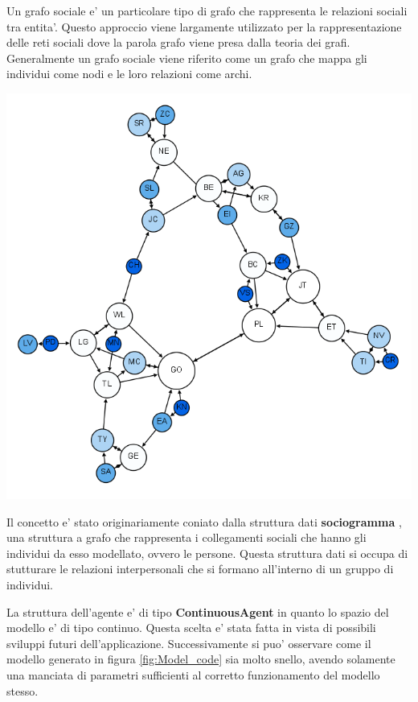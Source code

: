 Un grafo sociale e' un particolare tipo di grafo che rappresenta le relazioni sociali tra entita'.
Questo approccio viene largamente utilizzato per la rappresentazione delle reti sociali dove la 
parola grafo viene presa dalla teoria dei grafi. Generalmente un grafo sociale viene riferito come un
grafo che mappa gli individui come nodi e le loro relazioni come archi. \cite{wiki:Social_graph}

\begin{minipage}{\linewidth}
    \centering
    \includegraphics[width=\textwidth]{img/Moreno_Sociogram_3rd_Grade.png}
    \label{fig:social_graph}
\end{minipage}

Il concetto e' stato originariamente coniato dalla struttura dati \textbf{sociogramma} \cite{wiki:Sociogram}, 
una struttura a grafo che rappresenta i collegamenti sociali che hanno gli individui da esso modellato, ovvero le persone. 
Questa struttura dati si occupa di stutturare le relazioni interpersonali che si formano all'interno di un 
gruppo di individui. 

La struttura dell'agente e' di tipo \textbf{ContinuousAgent} in quanto lo 
spazio del modello e' di tipo continuo. Questa scelta e' stata fatta in vista di possibili 
sviluppi futuri dell'applicazione. Successivamente si puo' osservare come il modello generato 
in figura \ref{fig:Model_code} sia molto snello, avendo solamente una manciata di parametri 
sufficienti al corretto funzionamento del modello stesso. 

